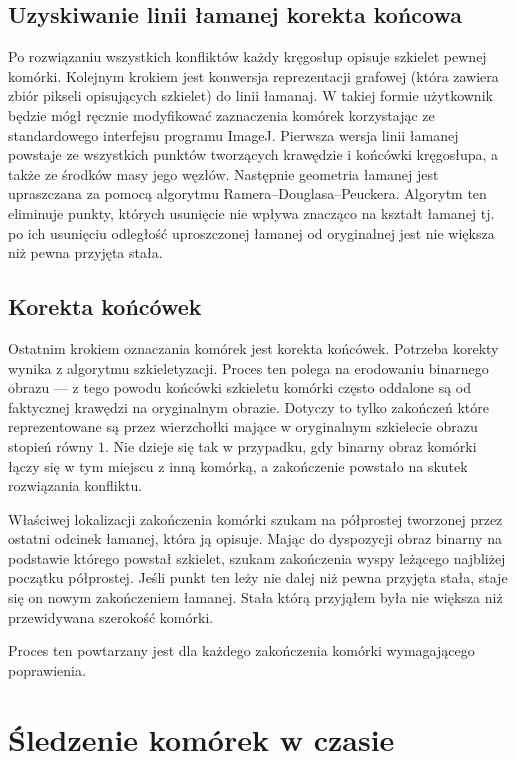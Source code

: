 \documentclass[declaration,shortabstract,mgr]{iithesis}
\begin{document}
\subsection{Uzyskiwanie linii łamanej korekta końcowa}

Po rozwiązaniu wszystkich konfliktów każdy kręgosłup opisuje szkielet pewnej komórki.
Kolejnym krokiem jest konwersja reprezentacji grafowej (która zawiera zbiór pikseli opisujących szkielet) do linii łamanaj.
W takiej formie użytkownik będzie mógł ręcznie modyfikować zaznaczenia komórek korzystając ze standardowego interfejsu programu ImageJ.
Pierwsza wersja linii łamanej powstaje ze wszystkich punktów tworzących krawędzie i końcówki kręgosłupa, a także ze środków masy jego węzłów.
Następnie geometria łamanej jest upraszczana za pomocą algorytmu Ramera--Douglasa--Peuckera\cite{algo:ramer-douglas-peucker}.
Algorytm ten eliminuje punkty, których usunięcie nie wpływa znacząco na kształt łamanej tj. po ich usunięciu odległość uproszczonej łamanej od oryginalnej jest nie większa niż pewna przyjęta stała.

\subsection{Korekta końcówek}

Ostatnim krokiem oznaczania komórek jest korekta końcówek.
Potrzeba korekty wynika z algorytmu szkieletyzacji.
Proces ten polega na erodowaniu binarnego obrazu --- z tego powodu końcówki szkieletu komórki często oddalone są od faktycznej krawędzi na oryginalnym obrazie.
Dotyczy to tylko zakończeń które reprezentowane są przez wierzchołki mające w oryginalnym szkielecie obrazu stopień równy $1$.
Nie dzieje się tak w przypadku, gdy binarny obraz komórki łączy się w tym miejscu z inną komórką, a zakończenie powstało na skutek rozwiązania konfliktu.

Właściwej lokalizacji zakończenia komórki szukam na półprostej tworzonej przez ostatni odcinek łamanej, która ją opisuje.
Mając do dyspozycji obraz binarny na podstawie którego powstał szkielet, szukam zakończenia wyspy leżącego najbliżej początku półprostej.
Jeśli punkt ten leży nie dalej niż pewna przyjęta stała, staje się on nowym zakończeniem łamanej.
Stała którą przyjąłem była nie większa niż przewidywana szerokość komórki.

Proces ten powtarzany jest dla każdego zakończenia komórki wymagającego poprawienia.


\section{Śledzenie komórek w czasie}
\label{sec:cell-tracking}
\end{document}
